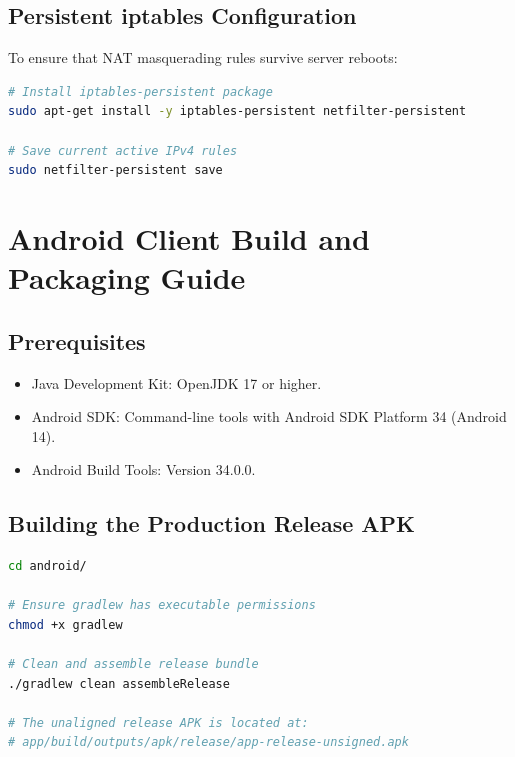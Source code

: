 \subsection{Persistent iptables Configuration}
To ensure that NAT masquerading rules survive server reboots:
\begin{lstlisting}[language=bash, caption={Persisting Firewall and NAT Rules across Reboots.}]
# Install iptables-persistent package
sudo apt-get install -y iptables-persistent netfilter-persistent

# Save current active IPv4 rules
sudo netfilter-persistent save
\end{lstlisting}

\section{Android Client Build and Packaging Guide}

\subsection{Prerequisites}
\begin{itemize}
    \item Java Development Kit: OpenJDK 17 or higher.
    \item Android SDK: Command-line tools with Android SDK Platform 34 (Android 14).
    \item Android Build Tools: Version 34.0.0.
\end{itemize}

\subsection{Building the Production Release APK}
\begin{lstlisting}[language=bash, caption={Compiling and Aligning the Production Android APK.}]
cd android/

# Ensure gradlew has executable permissions
chmod +x gradlew

# Clean and assemble release bundle
./gradlew clean assembleRelease

# The unaligned release APK is located at:
# app/build/outputs/apk/release/app-release-unsigned.apk
\end{lstlisting}

